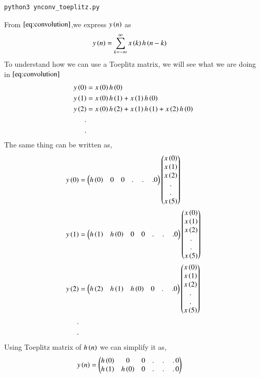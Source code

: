 \documentclass[journal,12pt,twocolumn]{IEEEtran}
\renewcommand\thesection{\arabic{section}}
\begin{document}
\begin{enumerate}[label=\thesection.\arabic*]
\begin{lstlisting}
python3 ynconv_toeplitz.py
     \end{lstlisting}
    From $\eqref{eq:convolution}$,we express $y\left(n\right)$ as
     \begin{align}
       y\left(n\right) &= \sum_{k = -\infty}^{\infty}x\left(k\right)h\left(n-k\right)
     \end{align}
    To understand how we can use a Toeplitz matrix, we will see what we are doing in $\eqref{eq:convolution}$ 
     \begin{align}
      y\left(0\right) &= x\left(0\right)h\left(0\right)\\
      y\left(1\right) &= x\left(0\right)h\left(1\right) + x\left(1\right)h\left(0\right)\\
      y\left(2\right) &= x\left(0\right)h\left(2\right) + x\left(1\right)h\left(1\right) + x\left(2\right)h\left(0\right)\\
      . \nonumber&\\ 
      .& \nonumber
     \end{align}
    The same thing can be written as,
     \begin{align}
       y\left(0\right) &= \begin{pmatrix}h\left(0\right) & 0 & 0 &.\,&.\,&.0\end{pmatrix}\begin{pmatrix}x\left(0\right)\\x\left(1\right)\\x\left(2\right)\\ . \\.\\x\left(5\right)\end{pmatrix}\\
       y\left(1\right) &= \begin{pmatrix}h\left(1\right) & h\left(0\right) & 0 & 0 &.\,&.\,&.0\end{pmatrix}\begin{pmatrix}x\left(0\right)\\x\left(1\right)\\x\left(2\right)\\ . \\.\\x\left(5\right)\end{pmatrix}\\
       y\left(2\right) &= \begin{pmatrix}h\left(2\right) & h\left(1\right) & h\left(0\right) & 0& .\,&.0\end{pmatrix}\begin{pmatrix}x\left(0\right)\\x\left(1\right)\\x\left(2\right)\\ . \\.\\x\left(5\right)\end{pmatrix}\\
       . & \nonumber \\
       .& \nonumber
     \end{align}
    Using Toeplitz matrix of $h\left(n\right)$ we can simplify it as,
     \begin{align}
       y\left(n\right) &= \begin{pmatrix}h\left(0\right) & 0 & 0 &.\,&.\,&.\,0 \\
                           h\left(1\right) & h\left(0\right) & 0 & .\,&.\,&.\,0 \\
\end{pmatrix}
\end{align}
\end{enumerate}
\end{document}
